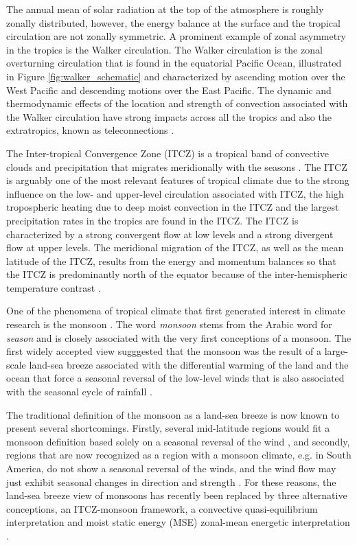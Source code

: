 The annual mean of solar radiation at the top of the atmosphere is roughly zonally distributed, however, the energy balance at the surface and the tropical circulation are not zonally symmetric. A prominent example of zonal asymmetry in the tropics is the Walker circulation. 
The Walker circulation is the zonal overturning circulation that is found in the equatorial Pacific Ocean, illustrated in Figure \ref{fig:walker_schematic} and characterized by ascending motion over the West Pacific and descending motions over the East Pacific\citep{walker1924,bjerknes1969,gill1980}. The dynamic and thermodynamic effects of the location and strength of convection associated with the Walker circulation have strong impacts across all the tropics and also the extratropics, known as teleconnections \citep{cai2019pantropical}.


The Inter-tropical Convergence Zone (ITCZ) is a tropical band of convective clouds and precipitation that migrates meridionally with the seasons \citep{schneider2014}. The ITCZ is arguably one of the most relevant features of tropical climate due to the strong influence on the low- and upper-level circulation associated with ITCZ, the high tropospheric heating due to deep moist convection in the ITCZ and the largest precipitation rates in the tropics are found in the ITCZ.
The ITCZ is characterized by a strong convergent flow at low levels and a strong divergent flow at upper levels. 
The meridional migration of the ITCZ, as well as the mean latitude of the ITCZ, results from the energy and momentum balances so that the ITCZ is predominantly north of the equator because of the inter-hemispheric temperature contrast \citep{donohoe2013,bischoff2016}.



One of the phenomena of tropical climate that first generated interest in climate research is the monsoon \citep{halley}. The word \textit{monsoon} stems from the Arabic word for \textit{season} and is closely associated with the very first conceptions of a monsoon. 
The first widely accepted view sugggested that the monsoon was the result of a large-scale land-sea breeze associated with the differential warming of the land and the ocean that force a seasonal reversal of the low-level winds that is also associated with the seasonal cycle of rainfall \citep{halley}. 

The traditional definition of the monsoon as a land-sea breeze is now known to present several shortcomings. Firstly, several mid-latitude regions would fit a monsoon definition based solely on a seasonal reversal of the wind \citep{gadgil2018}, and secondly, regions that are now recognized as a region with a monsoon climate, e.g. in South America, do not show a seasonal reversal of the winds, and the wind flow may just exhibit seasonal changes in direction and strength \citep{vera2006}. For these reasons, the land-sea breeze view of monsoons has recently been replaced by three alternative conceptions, an ITCZ-monsoon framework, a convective quasi-equilibrium interpretation and moist static energy (MSE) zonal-mean energetic interpretation \citep{biasutti2018global,hill2019,geen2020}. 

